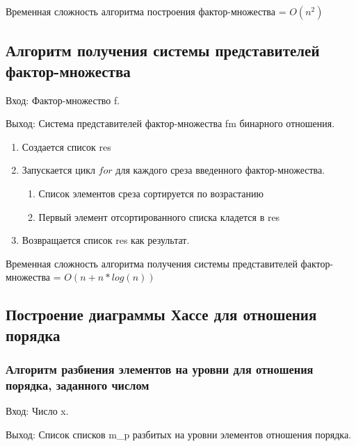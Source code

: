\documentclass[bachelor, och, labwork]{shiza}
\begin{document}
	Временная сложность алгоритма построения фактор-множества = $O(n^2)$
	
	
	\subsection{Алгоритм получения системы представителей фактор-множества}

	$\textit{Вход:}$ Фактор-множество f.
	
	$\textit{Выход:}$  Система представителей фактор-множества fm бинарного отношения.
	
	\begin{enumerate} 
		\item Создается список res
		\item Запускается цикл $for$ для каждого среза введенного фактор-множества. 
		\begin{enumerate} 
			\item Список элементов среза сортируется по возрастанию
			\item Первый элемент отсортированного списка кладется в res
		\end{enumerate} 
		\item Возвращается список res как результат.
	\end{enumerate} 

	Временная сложность алгоритма получения системы представителей фактор-множества = $O(n + n * log(n))$
	
	\subsection{Построение диаграммы Хассе для отношения порядка}	

	
		\subsubsection{Алгоритм разбиения элементов на уровни для отношения порядка, заданного числом}	
		
		$\textit{Вход:}$ Число x.
		
		$\textit{Выход:}$  Список списков m\_p разбитых на уровни элементов отношения порядка.
		
\end{document}
